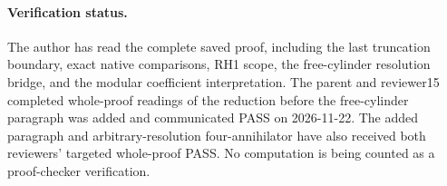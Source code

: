 \paragraph{Verification status.}
The author has read the complete saved proof, including the
last truncation boundary, exact native comparisons, RH1 scope,
the free-cylinder resolution bridge, and the modular coefficient
interpretation. The parent and reviewer15 completed whole-proof
readings of the reduction before the free-cylinder paragraph
was added and communicated PASS on 2026-11-22. The added
paragraph and arbitrary-resolution four-annihilator have also
received both reviewers' targeted whole-proof PASS. No computation
is being counted as a proof-checker verification.
